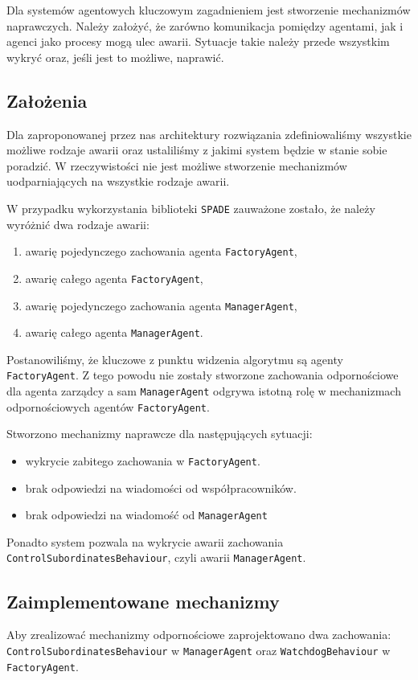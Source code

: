 Dla systemów agentowych kluczowym zagadnieniem jest stworzenie mechanizmów naprawczych. Należy założyć, że zarówno komunikacja pomiędzy agentami, jak i agenci jako procesy mogą ulec awarii. Sytuacje takie należy przede wszystkim wykryć oraz, jeśli jest to możliwe, naprawić. 

\subsection{Założenia}

Dla zaproponowanej przez nas architektury rozwiązania zdefiniowaliśmy wszystkie możliwe rodzaje awarii oraz ustaliliśmy z jakimi system będzie w stanie sobie poradzić. W rzeczywistości nie jest możliwe stworzenie mechanizmów uodparniających na wszystkie rodzaje awarii. 

W przypadku wykorzystania biblioteki \texttt{SPADE} zauważone zostało, że należy wyróżnić dwa rodzaje awarii:
\begin{enumerate}
	\item awarię pojedynczego zachowania agenta \texttt{FactoryAgent},
	\item awarię całego agenta \texttt{FactoryAgent},
	\item awarię pojedynczego zachowania agenta \texttt{ManagerAgent},
	\item awarię całego agenta \texttt{ManagerAgent}.
\end{enumerate}

Postanowiliśmy, że kluczowe z punktu widzenia algorytmu są agenty \texttt{FactoryAgent}. Z tego powodu nie zostały stworzone zachowania odpornościowe dla agenta zarządcy a sam \texttt{ManagerAgent} odgrywa istotną rolę w mechanizmach odpornościowych agentów \texttt{FactoryAgent}. 
 
Stworzono mechanizmy naprawcze dla następujących sytuacji:
\begin{itemize}
	\item wykrycie zabitego zachowania w \texttt{FactoryAgent}.
	\item brak odpowiedzi na wiadomości od współpracowników.
	\item brak odpowiedzi na wiadomość od \texttt{ManagerAgent}
\end{itemize}

Ponadto system pozwala na wykrycie awarii zachowania \texttt{ControlSubordinatesBehaviour}, czyli awarii \texttt{ManagerAgent}.

\subsection{Zaimplementowane mechanizmy}
Aby zrealizować mechanizmy odpornościowe zaprojektowano dwa zachowania: \texttt{ControlSubordinatesBehaviour} w \texttt{ManagerAgent} oraz \texttt{WatchdogBehaviour} w \texttt{FactoryAgent}.

